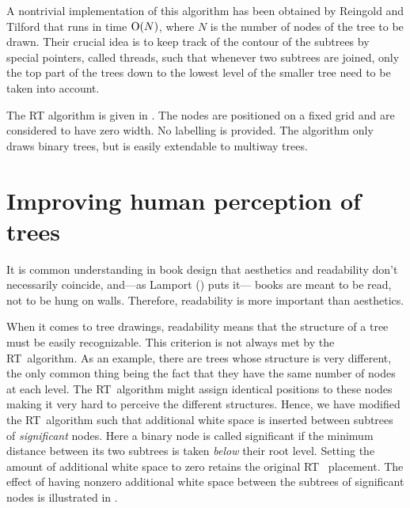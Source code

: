 A nontrivial implementation of                                                  
this algorithm has been obtained by Reingold and Tilford that runs              
in time ${\rm O}(N)$, where $N$ is the number of                                     
nodes of the tree to be drawn.                                                  
Their crucial idea is to keep track of the contour of the subtrees              
by special pointers, called threads, such that whenever                         
two subtrees are joined, only the                                               
top part of the trees down to the lowest level of the                           
smaller tree need to be taken into account.                              
                                                                                
The RT algorithm is given in \cite{TidierTrees}.
The nodes are positioned on a fixed grid and are             
considered to have zero width. No labelling is provided. The algorithm only     
draws binary trees, but is easily extendable to multiway trees.                 
                                                                                
\section{Improving human perception of trees}                                   

It is common understanding in book design that aesthetics and readability
don't necessarily coincide, and---as Lamport (\cite{LaTeX}) puts it---%
books are meant to be read, not to be hung on walls. Therefore, readability is
more important than aesthetics.

When it comes to tree drawings, readability means that the structure of
a tree must be easily recognizable. This criterion is not always met
by the RT~algorithm. As an example, there are trees whose structure is very
different, the only common thing being the fact that they have the same number
of nodes at each level. The RT~algorithm might assign identical positions to
these nodes making it very hard to perceive the different structures.
Hence, we have modified the RT~algorithm such that additional white space
is inserted between subtrees of 
\emph{significant} nodes. Here a binary node 
is called significant if the minimum distance
between its two subtrees is taken \emph{below} their root level.
Setting the amount of additional white space to zero retains the original RT~%
placement. The effect of having nonzero additional white space between 
the subtrees of significant
nodes is illustrated in  .

